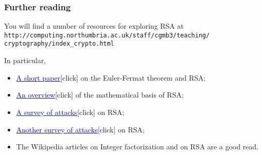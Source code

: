 \documentclass[10pt, hyperref={pdfpagelabels=false}]{beamer}
\begin{document}
\begin{frame}
\frametitle{Further reading}
You will find a number of resources for exploring RSA at 
\texttt{\small\color{blue}http://computing.northumbria.ac.uk/staff/cgmb3/teaching/\\cryptography/index\_crypto.html}

In particular, 
\begin{itemize}
\item \href{http://computing.northumbria.ac.uk/staff/cgmb3/teaching/cryptography/EulerFermatRSA.pdf}{\textcolor{blue}{A short paper}}[click] on the Euler-Fermat theorem and RSA;
\item \href{http://computing.northumbria.ac.uk/staff/cgmb3/teaching/cryptography/MathsOfRSA.pdf}{\textcolor{blue}{An overview}}[click] of the mathematical basis of RSA;
\item \href{http://computing.northumbria.ac.uk/staff/cgmb3/teaching/cryptography/PKCAttacks/BonehRSA-survey.pdf}{\textcolor{blue}{A survey of attacks}}[click] on RSA;
\item \href{http://computing.northumbria.ac.uk/staff/cgmb3/teaching/cryptography/PKCAttacks/KocherTimingAttacks.pdf}{\textcolor{blue}{Another survey of attacks}}[click] on RSA;
\item The Wikipedia articles on Integer factorization and on RSA are a good read.
\end{itemize}
\end{frame}
\end{document}
